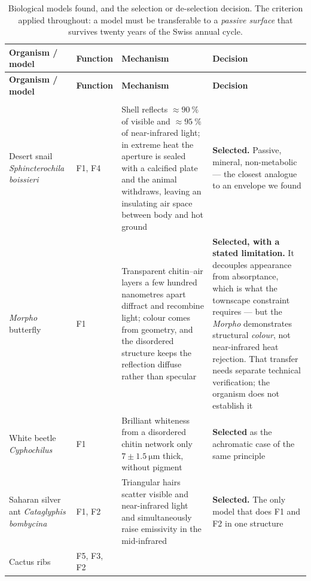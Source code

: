 {\footnotesize
\renewcommand{\arraystretch}{1.2}
\begin{longtable}{L{2.6cm} L{1.5cm} L{7.3cm} L{2.5cm}}
\caption{Biological models found, and the selection or de-selection decision.
The criterion applied throughout: a model must be transferable to a
\emph{passive surface} that survives twenty years of the Swiss annual cycle.}
\label{tab:models}\\
\toprule
\textbf{Organism / model} & \textbf{Function} & \textbf{Mechanism} & \textbf{Decision} \\
\midrule
\endfirsthead
\toprule
\textbf{Organism / model} & \textbf{Function} & \textbf{Mechanism} & \textbf{Decision} \\
\midrule
\endhead
\bottomrule
\endfoot
{}\\
Desert snail \emph{Sphincterochila boissieri} & F1, F4 &
Shell reflects $\approx\qty{90}{\percent}$ of visible and
$\approx\qty{95}{\percent}$ of near-infrared light; in extreme heat the aperture
is sealed with a calcified plate and the animal withdraws, leaving an insulating
air space between body and hot ground \parencite{asknature_snail} &
\textbf{Selected.} Passive, mineral, non-metabolic --- the closest analogue to
an envelope we found \\
\emph{Morpho} butterfly & F1 &
Transparent chitin--air layers a few hundred nanometres apart diffract and
recombine light; colour comes from geometry, and the disordered structure keeps
the reflection diffuse rather than specular
\parencite{asknature_morpho} &
\textbf{Selected, with a stated limitation.} It decouples appearance from
absorptance, which is what the townscape constraint requires --- but the
\emph{Morpho} demonstrates structural \emph{colour}, not near-infrared heat
rejection. That transfer needs separate technical verification; the organism
does not establish it \\
White beetle \emph{Cyphochilus} & F1 &
Brilliant whiteness from a disordered chitin network only
$7\pm\qty{1.5}{\micro\metre}$ thick, without pigment \parencite{vukusic2007} &
\textbf{Selected} as the achromatic case of the same principle \\
Saharan silver ant \emph{Cataglyphis bombycina} & F1, F2 &
Triangular hairs scatter visible and near-infrared light and simultaneously
raise emissivity in the mid-infrared \parencite{shi2015} &
\textbf{Selected.} The only model that does F1 and F2 in one structure \\
Cactus ribs & F5, F3, F2 &

\end{longtable}}

